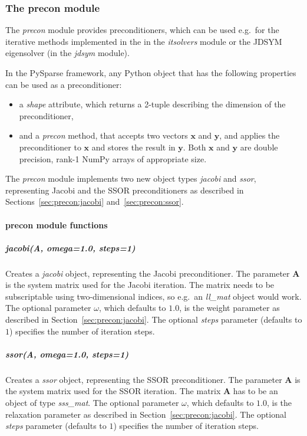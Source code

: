 \documentclass[a4paper]{article}
\newcommand{\mat}[1]{\ensuremath{\boldsymbol{#1}}}
\newcommand{\vect}[1]{\ensuremath{\mathbf{#1}}}
\begin{document}
\subsubsection{The precon module}
\label{sec:python:precon}
%
The \textit{precon} module provides preconditioners, which can be used
e.g.\ for the iterative methods implemented in the in the
\textit{itsolvers} module or the JDSYM eigensolver (in the
\textit{jdsym} module).

In the PySparse framework, any Python object that has the following
properties can be used as a preconditioner:
\begin{itemize}
\item a \textit{shape} attribute, which returns a 2-tuple describing
  the dimension of the preconditioner,
\item and a \textit{precon} method, that accepts two vectors
  $\vect{x}$ and $\vect{y}$, and applies the preconditioner to
  $\vect{x}$ and stores the result in $\vect{y}$. Both $\vect{x}$ and
  $\vect{y}$ are double precision, rank-1 NumPy arrays of appropriate
  size.
\end{itemize}

The \textit{precon} module implements two new object types
\textit{jacobi} and \textit{ssor}, representing Jacobi and the SSOR
preconditioners as described in Sections~\ref{sec:precon:jacobi}
and~\ref{sec:precon:ssor}.

\paragraph{precon module functions}
%

\subparagraph{jacobi(A, omega=1.0, steps=1)}
%
Creates a \textit{jacobi} object, representing the Jacobi
preconditioner. The parameter $\mat{A}$ is the system matrix used for
the Jacobi iteration. The matrix needs to be subscriptable using
two-dimensional indices, so e.g.\ an \textit{ll\_mat} object would
work.  The optional parameter $\omega$, which defaults to $1.0$, is
the weight parameter as described in Section~\ref{sec:precon:jacobi}.
The optional \textit{steps} parameter (defaults to $1$) specifies the
number of iteration steps.

\subparagraph{ssor(A, omega=1.0, steps=1)}
%
Creates a \textit{ssor} object, representing the SSOR preconditioner.
The parameter $\mat{A}$ is the system matrix used for the SSOR
iteration.  The matrix $\mat{A}$ has to be an object of type
\textit{sss\_mat}.  The optional parameter $\omega$, which defaults to
$1.0$, is the relaxation parameter as described in
Section~\ref{sec:precon:jacobi}. The optional \textit{steps} parameter
(defaults to $1$) specifies the number of iteration steps.
\end{document}
